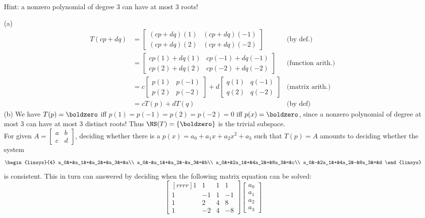 Hint: a nonzero polynomial of degree 3 can have at most 3 roots! 
\ee
\begin{solution}
\noindent (a) 
\begin{align*}
T(cp+dq)&=\begin{bmatrix}(cp+dq)(1)&(cp+dq)(-1)\\ (cp+dq)(2)&(cp+dq)(-2)\end{bmatrix} &\text{(by def.)}\\
&=\begin{bmatrix}cp(1)+dq(1)&cp(-1)+dq(-1)\\ cp(2)+dq(2)&cp(-2)+dq(-2)\end{bmatrix} &\text{(function arith.)}\
\\
&=c\begin{bmatrix}p(1)&p(-1)\\ p(2)&p(-2)\end{bmatrix}+d\begin{bmatrix}q(1)&q(-1)\\ q(2)&q(-2)\end{bmatrix}&\text{(matrix arith.)}\\
&=cT(p)+dT(q) &\text{(by def)}
\end{align*}
\noindent 
(b) We have $T(p)=\boldzero$ iff $p(1)=p(-1)=p(2)=p(-2)=0$ iff $p(x)=\boldzero$, since a nonzero polynomial of degree at most 3 can have at most 3 distinct roots!  Thus $\NS(T)=\{\boldzero\}$ is the trivial subspace.
\\
For given $A=\begin{bmatrix}
a&b\\ c&d
\end{bmatrix}$, deciding whether there is a $p(x)=a_0+a_1x+a_2x^2+a_3$ such that $T(p)=A$ amounts to deciding whether the system 
\[
\begin{linsys}{4}
a_0&+&a_1&+&a_2&+&a_3&=&a\\
a_0&-&a_1&+&a_2&-&a_3&=&b\\
a_0&+&2a_1&+&4a_2&+&8a_3&=&c\\
a_0&-&2a_1&+&4a_2&-&8a_3&=&d
\end{linsys}
\]
is consistent. This in turn can answered by deciding when the following matrix equation can be solved: 
\[
\begin{bmatrix}[rrrr]
1&1&1&1\\
1&-1&1&-1\\
1&2&4&8\\
1&-2&4&-8
\end{bmatrix}
\begin{bmatrix}
a_0\\ a_1\\ a_2\\ a_3

\end{bmatrix}\]
\end{solution}
